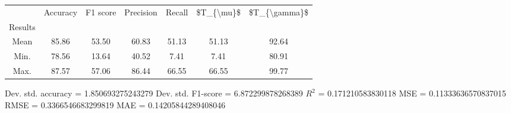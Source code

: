 \begin{tabular}{|c|c|c|c|c|c|c|}
\toprule
{} &  Accuracy &  F1 score &  Precision &  Recall &  \$T\_\{\textbackslash mu\}\$ &  \$T\_\{\textbackslash gamma\}\$ \\
Results &           &           &            &         &            &               \\
\hline
Mean    &     85.86 &     53.50 &      60.83 &   51.13 &      51.13 &         92.64 \\
Min.    &     78.56 &     13.64 &      40.52 &    7.41 &       7.41 &         80.91 \\
Max.    &     87.57 &     57.06 &      86.44 &   66.55 &      66.55 &         99.77 \\
\bottomrule
\end{tabular}

 Dev. std. accuracy = 1.850693275243279
 Dev. std. F1-score = 6.872299878268389
 $R^2$ = 0.171210583830118
 MSE = 0.11333636570837015
 RMSE = 0.3366546683299819
 MAE = 0.14205844289408046